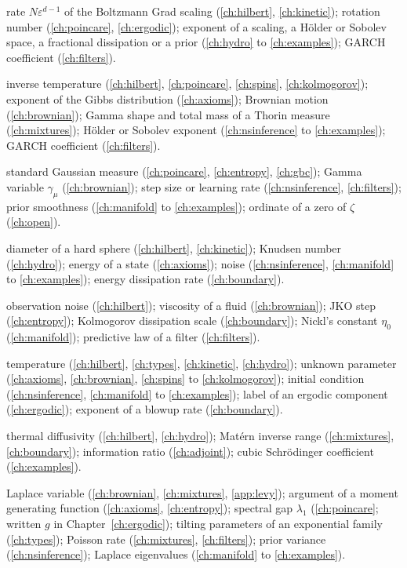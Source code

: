 \begin{description}[leftmargin=2.2em,labelwidth=1.8em,labelsep=0.4em,itemsep=0pt,parsep=0pt]
\item[$\alpha$] rate $N\varepsilon^{d-1}$ of the Boltzmann Grad scaling (\ref{ch:hilbert}, \ref{ch:kinetic}); rotation number (\ref{ch:poincare}, \ref{ch:ergodic}); exponent of a scaling, a H\"older or Sobolev space, a fractional dissipation or a prior (\ref{ch:hydro} to \ref{ch:examples}); GARCH coefficient (\ref{ch:filters}).
\item[$\beta$] inverse temperature (\ref{ch:hilbert}, \ref{ch:poincare}, \ref{ch:spins}, \ref{ch:kolmogorov}); exponent of the Gibbs distribution (\ref{ch:axioms}); Brownian motion (\ref{ch:brownian}); Gamma shape and total mass of a Thorin measure (\ref{ch:mixtures}); H\"older or Sobolev exponent (\ref{ch:nsinference} to \ref{ch:examples}); GARCH coefficient (\ref{ch:filters}).
\item[$\gamma$] standard Gaussian measure (\ref{ch:poincare}, \ref{ch:entropy}, \ref{ch:gbc}); Gamma variable $\gamma_\mu$ (\ref{ch:brownian}); step size or learning rate (\ref{ch:nsinference}, \ref{ch:filters}); prior smoothness (\ref{ch:manifold} to \ref{ch:examples}); ordinate of a zero of $\zeta$ (\ref{ch:open}).
\item[$\varepsilon$] diameter of a hard sphere (\ref{ch:hilbert}, \ref{ch:kinetic}); Knudsen number (\ref{ch:hydro}); energy of a state (\ref{ch:axioms}); noise (\ref{ch:nsinference}, \ref{ch:manifold} to \ref{ch:examples}); energy dissipation rate (\ref{ch:boundary}).
\item[$\eta$] observation noise (\ref{ch:hilbert}); viscosity of a fluid (\ref{ch:brownian}); JKO step (\ref{ch:entropy}); Kolmogorov dissipation scale (\ref{ch:boundary}); Nickl's constant $\eta_0$ (\ref{ch:manifold}); predictive law of a filter (\ref{ch:filters}).
\item[$\theta$] temperature (\ref{ch:hilbert}, \ref{ch:types}, \ref{ch:kinetic}, \ref{ch:hydro}); unknown parameter (\ref{ch:axioms}, \ref{ch:brownian}, \ref{ch:spins} to \ref{ch:kolmogorov}); initial condition (\ref{ch:nsinference}, \ref{ch:manifold} to \ref{ch:examples}); label of an ergodic component (\ref{ch:ergodic}); exponent of a blowup rate (\ref{ch:boundary}).
\item[$\kappa$] thermal diffusivity (\ref{ch:hilbert}, \ref{ch:hydro}); Mat\'ern inverse range (\ref{ch:mixtures}, \ref{ch:boundary}); information ratio (\ref{ch:adjoint}); cubic Schr\"odinger coefficient (\ref{ch:examples}).
\item[$\lambda$] Laplace variable (\ref{ch:brownian}, \ref{ch:mixtures}, \ref{app:levy}); argument of a moment generating function (\ref{ch:axioms}, \ref{ch:entropy}); spectral gap $\lambda_1$ (\ref{ch:poincare}; written $g$ in Chapter~\ref{ch:ergodic}); tilting parameters of an exponential family (\ref{ch:types}); Poisson rate (\ref{ch:mixtures}, \ref{ch:filters}); prior variance (\ref{ch:nsinference}); Laplace eigenvalues (\ref{ch:manifold} to \ref{ch:examples}).

\end{description}
